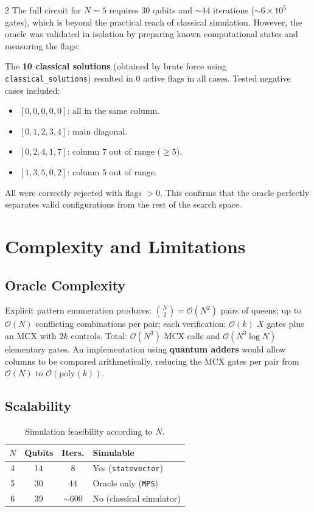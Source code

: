\documentclass[9pt, a4paper]{extarticle}
\newcommand{\BigO}{\mathcal{O}}
\begin{document}
\begin{multicols}{2}
The full circuit for $N\!=\!5$ requires 30 qubits and $\sim$44 iterations ($\sim\!6\!\times\!10^5$ gates), which is beyond the practical reach of classical simulation. However, the oracle was validated in isolation by preparing known computational states and measuring the flags:

The \textbf{10 classical solutions} (obtained by brute force using \texttt{classical\_solutions}) resulted in 0 active flags in all cases.
Tested negative cases included:
\begin{itemize}
    \item $[0,0,0,0,0]$: all in the same column.
    \item $[0,1,2,3,4]$: main diagonal.
    \item $[0,2,4,1,7]$: column 7 out of range ($\geq 5$).
    \item $[1,3,5,0,2]$: column 5 out of range.
\end{itemize}
All were correctly rejected with flags $> 0$. This confirms that the oracle perfectly separates valid configurations from the rest of the search space.

\section{Complexity and Limitations}

\subsection{Oracle Complexity}

Explicit pattern enumeration produces: $\binom{N}{2} = \BigO(N^2)$ pairs of queens; up to $\BigO(N)$ conflicting combinations per pair; each verification: $\BigO(k)$ $X$ gates plus an MCX with $2k$ controls.
Total: $\BigO(N^3)$ MCX calls and $\BigO(N^3 \log N)$ elementary gates.
An implementation using \textbf{quantum adders} would allow columns to be compared arithmetically, reducing the MCX gates per pair from $\BigO(N)$ to $\BigO(\text{poly}(k))$.

\subsection{Scalability}

\begin{table}[H]
    \centering
    \caption{Simulation feasibility according to $N$.}
    \label{tab:scale}
    \scriptsize
    \begin{tabular}{@{}cccl@{}}
        \toprule
        $N$ & Qubits & Iters. & Simulable \\
        \midrule
        4 & 14 & 8    & Yes (\texttt{statevector}) \\
        5 & 30 & 44   & Oracle only (\texttt{MPS}) \\
        6 & 39 & $\sim$600 & No (classical simulator) \\
        \bottomrule
    \end{tabular}
\end{table}


\end{multicols}
\end{document}
